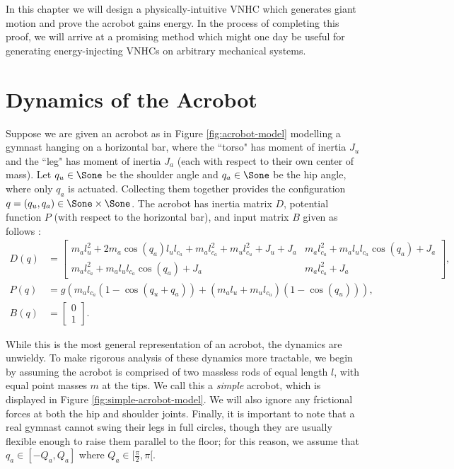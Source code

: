 In this chapter we will design a physically-intuitive VNHC which generates giant
motion and prove the acrobot gains energy. 
In the process of completing this proof, we will arrive at a promising method
which might one day be useful for generating energy-injecting VNHCs on arbitrary
mechanical systems.

\section{Dynamics of the Acrobot}
Suppose we are given an acrobot as in Figure \ref{fig:acrobot-model} modelling a
gymnast hanging on a horizontal bar, where the ``torso" has moment of
inertia \(J_u\) and the ``leg" has moment of inertia \(J_a\) (each with respect
to their own center of mass).
Let \(q_u \in \Sone\) be the shoulder angle and \(q_a \in \Sone\) 
be the hip angle, where only \(q_a\) is actuated. 
Collecting them together provides the configuration
\(q = (q_u,q_a) \in \Sone \times \Sone\). 
The acrobot has inertia matrix \(D\), potential function \(P\) (with respect to
the horizontal bar), and input matrix \(B\)  given as
follows \cite{xingbo_thesis}:
\begin{align}\label{eqn:general-acrobot-inertia}
    D(q) &= \begin{bmatrix}
      m_al_u^2 + 2m_a\cos(q_a)l_u l_{c_a} + m_al_{c_a}^2 + m_ul_{c_u}^2 + J_u + J_a &
      m_al_{c_a}^2 + m_al_ul_{c_a}\cos(q_a) + J_a \\
      m_al_{c_a}^2 + m_al_ul_{c_a}\cos(q_a) + J_a &
      m_al_{c_a}^2 + J_a
    \end{bmatrix} 
    , \\
    \label{eqn:general-acrobot-potential}
    P(q) &= g\left(m_al_{c_a}(1 - \cos(q_u+q_a)) + 
        (m_al_u + m_ul_{c_u})(1-\cos(q_u))\right) 
    , \\
    B(q) &= \begin{bmatrix} 0 \\ 1 \end{bmatrix}
    .
\end{align}

While this is the most general representation of an acrobot, the dynamics
are unwieldy.
To make rigorous analysis of these dynamics more tractable, we begin by assuming
the acrobot is comprised of two massless rods of equal length \(l\), with equal
point masses \(m\) at the tips.
We call this a \textit{simple} acrobot, which is displayed in Figure
\ref{fig:simple-acrobot-model}.
We will also ignore any frictional forces at both the hip and shoulder joints. 
Finally, it is important to note that a real gymnast cannot swing their legs in
full circles, though they are usually flexible enough to raise them parallel to
the floor; 
for this reason, we assume that \(q_a \in [-Q_a, Q_a]\) where 
\(Q_a \in [\frac{\pi}{2}, \pi[\). 

